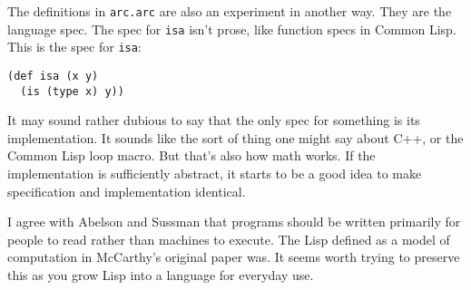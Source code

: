 \documentclass[a4paper,12pt]{book}
\begin{document}
The definitions in \verb|arc.arc| are also an experiment in another way.
They are the language spec.  The spec for \verb|isa| isn't prose, like
function specs in {\sc{}Common Lisp}.  This is the spec for \verb|isa|:

\begin{verbatim}
(def isa (x y) 
  (is (type x) y))
\end{verbatim}

It may sound rather dubious to say that the only spec for something
is its implementation.  It sounds like the sort of thing one might
say about C++, or the {\sc{}Common Lisp} loop macro.  But that's also how
math works.  If the implementation is sufficiently abstract, it
starts to be a good idea to make specification and implementation
identical.

I agree with Abelson and Sussman that programs should be written
primarily for people to read rather than machines to execute.  The
{\sc{}Lisp} defined as a model of computation in McCarthy's original paper
was.  It seems worth trying to preserve this as you grow {\sc{}Lisp} into
a language for everyday use.
\end{document}
